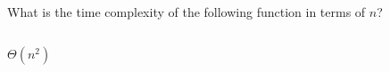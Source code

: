 \begin{prob}
    What is the time complexity of the following function in terms of $n$?

    \inputminted{python}{./code.py}

    \begin{soln}
        $\Theta(n^2)$
    \end{soln}

\end{prob}
